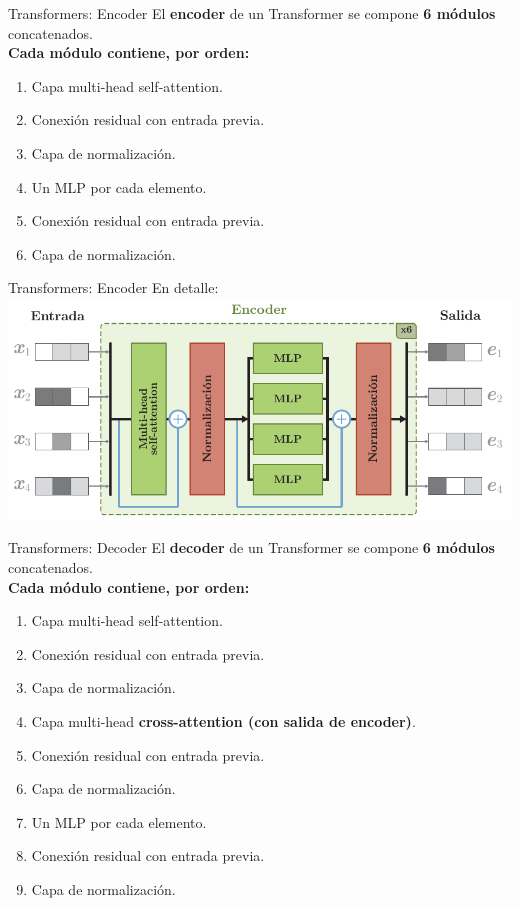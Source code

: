 \documentclass[aspectratio=169]{beamer}
\begin{document}
\begin{frame}{Transformers: Encoder}
  El \textbf{encoder} de un Transformer se compone \textbf{6 módulos} concatenados.\\
  \vspace{.5cm}
  \textbf{Cada módulo contiene, por orden:}
  \begin{enumerate}
    \item Capa multi-head self-attention.
    \item Conexión residual con entrada previa.
    \item Capa de normalización.
    \item Un MLP por cada elemento.
    \item Conexión residual con entrada previa.
    \item Capa de normalización.
  \end{enumerate}

\end{frame}

\begin{frame}{Transformers: Encoder}
  En detalle:\\
  \vspace{.5cm}
  \includegraphics[width=.85\textwidth, center]{imgs/tema4/att/Transformer_enc.pdf}
\end{frame}

\begin{frame}{Transformers: Decoder}
  El \textbf{decoder} de un Transformer se compone \textbf{6 módulos} concatenados.\\
  \vspace{.5cm}
  \textbf{Cada módulo contiene, por orden:}
  \begin{enumerate}
    \item Capa multi-head self-attention.
    \item Conexión residual con entrada previa.
    \item Capa de normalización.
    \item Capa multi-head \textbf{cross-attention (con salida de encoder)}.
    \item Conexión residual con entrada previa.
    \item Capa de normalización.
    \item Un MLP por cada elemento.
    \item Conexión residual con entrada previa.
    \item Capa de normalización.
  \end{enumerate}\end{frame}
\end{document}
